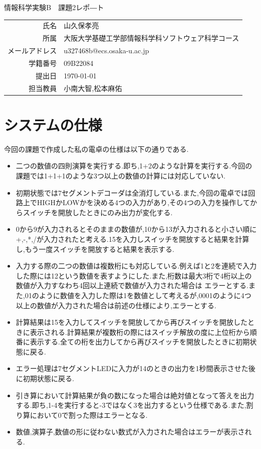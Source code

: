 \documentclass[dvipdfmx]{jarticle}
\begin{document}
\begin{titlepage}
    \begin{center}
        {\huge 情報科学実験B　課題2レポ―ト}
        \vspace{180pt}\\
        \begin{tabular}{rl}
            氏名 & 山久保孝亮\\
            所属 & 大阪大学基礎工学部情報科学科ソフトウェア科学コース\\
            メールアドレス & u327468b@ecs.osaka-u.ac.jp\\
            学籍番号 & 09B22084\\
            提出日 & \today\\
            担当教員 & 小南大智,松本麻佑
        \end{tabular}
    \end{center}
\end{titlepage}
\section{システムの仕様}
今回の課題で作成した私の電卓の仕様は以下の通りである.
\begin{itemize}
    \item 二つの数値の四則演算を実行する.即ち,1+2のような計算を実行する.今回の課題では1+1+1のような3つ以上の数値の計算には対応していない.
    \item 初期状態では7セグメントデコーダは全消灯している.また,今回の電卓では回路上でHIGHかLOWかを決める4つの入力があり,その4つの入力を操作してからスイッチを開放したときにのみ出力が変化する.
    \item 0から9が入力されるとそのままの数値が,10から13が入力されると小さい順に+,-,*,/が入力されたと考える.15を入力しスイッチを開放すると結果を計算し,もう一度スイッチを開放すると結果を表示する.
    \item 入力する際の二つの数値は複数桁にも対応している.例えば1と2を連続で入力した際には12という数値を表すようにした.また,桁数は最大3桁で4桁以上の数値が入力すなわち4回以上連続で数値が入力された場合は
    エラーとする.また,01のように数値を入力した際は1を数値として考えるが,0001のように4つ以上の数値が入力された場合は前述の仕様により,エラーとする.
    \item 計算結果は15を入力してスイッチを開放してから再びスイッチを開放したときに表示される.計算結果が複数桁の際にはスイッチ解放の度に上位桁から順番に表示する.全ての桁を出力してから再びスイッチを開放したときに初期状態に戻る.
    \item エラー処理は7セグメントLEDに入力が14のときの出力を1秒間表示させた後に初期状態に戻る.
    \item 引き算において計算結果が負の数になった場合は絶対値となって答えを出力する.即ち,1-4を実行すると-3ではなく3を出力するという仕様である.また,割り算において0で割った際はエラーとなる.
    \item 数値,演算子,数値の形に従わない数式が入力された場合はエラーが表示される.
\end{itemize}
\end{document}
